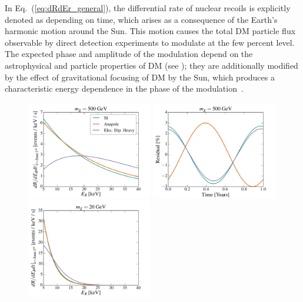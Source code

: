 \documentclass[11pt]{article}
\newcommand{\Eq}[1]{Eq.~(\ref{#1})} \newcommand{\Eqs}[2]{Eqs.~(\ref{#1}) and (\ref{#2})} \newcommand{\Eqm}[2]{Eqs.~(\ref{#1}) through (\ref{#2})}
\begin{document}
In \Eq{eq:dRdEr_general}, the differential rate of nuclear recoils is explicitly denoted as depending on time, which arises as a consequence of the Earth's harmonic motion around the Sun. This motion causes the total DM particle flux observable by direct detection experiments to modulate at the few percent level. The expected phase and amplitude of the modulation depend on the astrophysical and particle properties of DM (see \eg \cite{Green:2000ga,Gelmini:2000dm,DelNobile:2015nua}); they are additionally modified by the effect of gravitational focusing of DM by the Sun, which produces a characteristic energy dependence in the phase of the modulation~\cite{Danby01021957,Griest:1987vc,Sikivie:2002bj,Alenazi:2006wu,Lee:2013wza,DelNobile:2015nua}. 

\begin{figure}
\centering
\includegraphics[width=0.49\textwidth, trim=0.cm 0.0cm 0.cm 0.0cm,clip=true]{plots/RecoilComparison_500GeV.pdf}
\includegraphics[width=0.49\textwidth, trim=0.cm 0.0cm 0.cm 0.0cm,clip=true]{plots/Xenon_SIvsAnapole_500GeV_Residual_Theory.pdf}
\includegraphics[width=0.49\textwidth, trim=0.cm 0.0cm 0.cm 0.0cm,clip=true]{plots/RecoilComparison_20GeV.pdf}

\end{figure}
\end{document}
